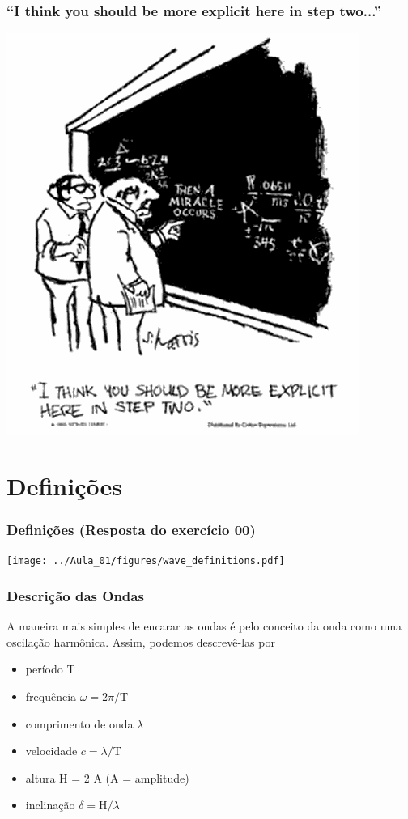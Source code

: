 \begin{frame}
  \frametitle{``I think you should be more explicit here in step two...''}
  \includegraphics[scale=0.45]{./figures/then-a-miracle-occurs-cartoon.png}
\end{frame}

\section{Definições}
\begin{frame}
  \frametitle{Definições (Resposta do exercício 00)}
  \begin{center}
    \texttt{[image: ../Aula\_01/figures/wave\_definitions.pdf]}
  \end{center}
\end{frame}

\begin{frame}
\frametitle{Descrição das Ondas}
  \begin{block}{}
    A maneira mais simples de encarar as ondas é pelo conceito da onda como uma
    oscilação harmônica. Assim, podemos descrevê-las por
  \end{block}
    \begin{itemize}[<+-| alert@+>]
      \item período T
      \item frequência $\omega = 2 \pi / \text{T}$
      \item comprimento de onda $\lambda$
      \item velocidade $c = \lambda / \text{T}$
      \item altura H = 2 A (A = amplitude)
      \item inclinação $\delta = \text{H} / \lambda$
    \end{itemize}
\end{frame}

